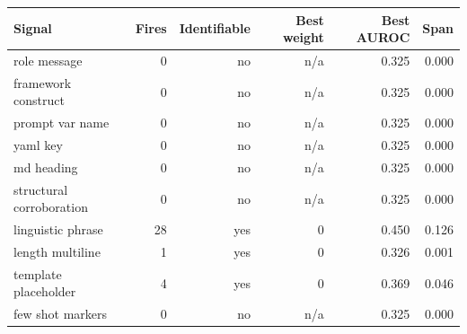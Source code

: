 \begin{tabular}{lrrrrr}
\toprule
Signal & Fires & Identifiable & Best weight & Best AUROC & Span \\
\midrule
role message & 0 & no & n/a & 0.325 & 0.000 \\
framework construct & 0 & no & n/a & 0.325 & 0.000 \\
prompt var name & 0 & no & n/a & 0.325 & 0.000 \\
yaml key & 0 & no & n/a & 0.325 & 0.000 \\
md heading & 0 & no & n/a & 0.325 & 0.000 \\
structural corroboration & 0 & no & n/a & 0.325 & 0.000 \\
linguistic phrase & 28 & yes & 0 & 0.450 & 0.126 \\
length multiline & 1 & yes & 0 & 0.326 & 0.001 \\
template placeholder & 4 & yes & 0 & 0.369 & 0.046 \\
few shot markers & 0 & no & n/a & 0.325 & 0.000 \\
\bottomrule
\end{tabular}
